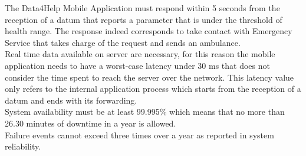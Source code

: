 The Data4Help Mobile Application must respond within 5 seconds from the reception of a datum that reports a parameter that is under the threshold of health range. The response indeed corresponds to take contact with Emergency Service that takes charge of the request and sends an ambulance. \\
Real time data available on server are necessary, for this reason the mobile application needs to have a worst-case latency under 30 ms that does not consider the time spent to reach the server over the network. This latency value only refers to the internal application process which starts from the reception of a datum and ends with its forwarding.  \\ 
System availability must be at least 99.995\% which means that no more than 26.30 minutes of downtime in a year is allowed.  \\
Failure events cannot exceed three times over a year as reported in system reliability. 
